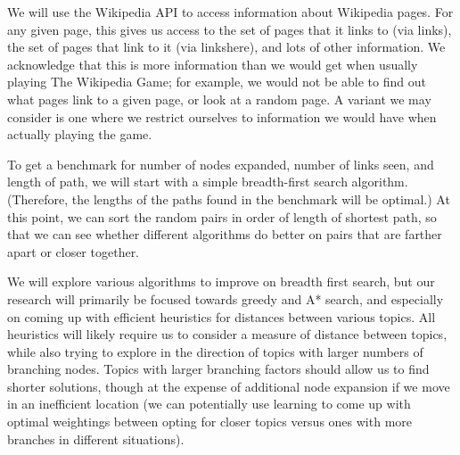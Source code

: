 \documentclass[11pt]{article}
\begin{document}
{We will use the Wikipedia API to access information about Wikipedia pages.  For any given page, this gives us access to the set of pages that it links to (via links), the set of pages that link to it (via linkshere), and lots of other information.  We acknowledge that this is more information than we would get when usually playing The Wikipedia Game; for example, we would not be able to find out what pages link to a given page, or look at a random page.  A variant we may consider is one where we restrict ourselves to information we would have when actually playing the game.


To get a benchmark for number of nodes expanded, number of links seen, and length of path, we will start with a simple breadth-first search algorithm.  (Therefore, the lengths of the paths found in the benchmark will be optimal.)  At this point, we can sort the random pairs in order of length of shortest path, so that we can see whether different algorithms do better on pairs that are farther apart or closer together. %

We will explore various algorithms to improve on breadth first search, but our research will primarily be focused towards greedy and A* search, and especially on coming up with efficient heuristics for distances between various topics. All heuristics will likely require us to consider a measure of distance between topics, while also trying to explore in the direction of topics with larger numbers of branching nodes. Topics with larger branching factors should allow us to find shorter solutions, though at the expense of additional node expansion if we move in an inefficient location (we can potentially use learning to come up with optimal weightings between opting for closer topics versus ones with more branches in different situations).

}
\end{document}
